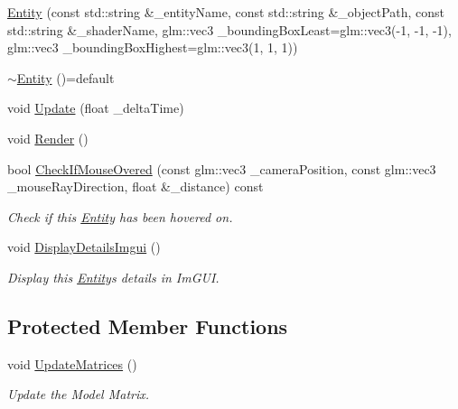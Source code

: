 \begin{DoxyCompactItemize}
\mbox{\hyperlink{classpiolot_1_1_entity_ad6a8344aece7f5c4b63f46623f5bed18}{Entity}} (const std\+::string \&\+\_\+entity\+Name, const std\+::string \&\+\_\+object\+Path, const std\+::string \&\+\_\+shader\+Name, glm\+::vec3 \+\_\+bounding\+Box\+Least=glm\+::vec3(-\/1, -\/1, -\/1), glm\+::vec3 \+\_\+bounding\+Box\+Highest=glm\+::vec3(1, 1, 1))
\item 
\mbox{\hyperlink{classpiolot_1_1_entity_a7264c4056ad0f48408e1edfab38fe4e8}{$\sim$\+Entity}} ()=default
\item 
void \mbox{\hyperlink{classpiolot_1_1_entity_a35aed98e4aedd0aa64ee512f83d912ec}{Update}} (float \+\_\+delta\+Time)
\item 
void \mbox{\hyperlink{classpiolot_1_1_entity_a9b7f0caf16313208ca115504a2453a12}{Render}} ()
\item 
bool \mbox{\hyperlink{classpiolot_1_1_entity_affee050e5904bd4dff3239804bea6e7e}{Check\+If\+Mouse\+Overed}} (const glm\+::vec3 \+\_\+camera\+Position, const glm\+::vec3 \+\_\+mouse\+Ray\+Direction, float \&\+\_\+distance) const
\begin{DoxyCompactList}\small\item\em Check if this \mbox{\hyperlink{classpiolot_1_1_entity}{Entity}} has been hovered on. \end{DoxyCompactList}\item 
void \mbox{\hyperlink{classpiolot_1_1_entity_acc08eed4d3e1185dfc3fb396720443e5}{Display\+Details\+Imgui}} ()
\begin{DoxyCompactList}\small\item\em Display this \mbox{\hyperlink{classpiolot_1_1_entity}{Entity}}\textquotesingle{}s details in Im\+G\+UI. \end{DoxyCompactList}\end{DoxyCompactItemize}
\subsection*{Protected Member Functions}
\begin{DoxyCompactItemize}
\item 
void \mbox{\hyperlink{classpiolot_1_1_entity_a100b4699f74f506217c4d545f5a81f58}{Update\+Matrices}} ()
\begin{DoxyCompactList}\small\item\em Update the Model Matrix. \end{DoxyCompactList}\end{DoxyCompactItemize}
